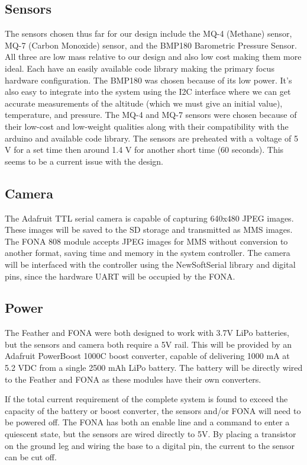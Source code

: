 \documentclass[conference,compsoc]{IEEEtran}
\begin{document}
\subsection{Sensors}
The sensors chosen thus far for our design include the MQ-4 (Methane) sensor, MQ-7 (Carbon Monoxide) sensor, and the BMP180 Barometric Pressure Sensor. All three are low mass relative to our design and also low cost making them more ideal. Each have an easily available code library making the primary focus hardware configuration. The BMP180 was chosen because of its low power. It’s also easy to integrate into the system using the I2C interface where we can get accurate measurements of the altitude (which we must give an initial value), temperature, and pressure. The MQ-4 and MQ-7 sensors were chosen because of their low-cost and low-weight qualities along with their compatibility with the arduino and available code library. The sensors are preheated with a voltage of 5 V for a set time then around 1.4 V for another short time (60 seconds). This seems to be a current issue with the design.

\subsection{Camera}
The Adafruit TTL serial camera is capable of capturing 640x480 JPEG images.  These images will be saved to the SD storage and transmitted as MMS images.  The FONA 808 module accepts JPEG images for MMS without conversion to another format, saving time and memory in the system controller.  The camera will be interfaced with the controller using the NewSoftSerial library and digital pins, since the hardware UART will be occupied by the FONA.

\subsection{Power}
The Feather and FONA were both designed to work with 3.7V LiPo batteries, but the sensors and camera both require a 5V rail.  This will be provided by an Adafruit PowerBoost 1000C boost converter, capable of delivering 1000 mA at 5.2 VDC from a single 2500 mAh LiPo battery.  The battery will be directly wired to the Feather and FONA as these modules have their own converters.

If the total current requirement of the complete system is found to exceed the capacity of the battery or boost converter, the sensors and/or FONA will need to be powered off.  The FONA has both an enable line and a command to enter a quiescent state, but the sensors are wired directly to 5V.  By placing a transistor on the ground leg and wiring the base to a digital pin, the current to the sensor can be cut off.
\end{document}
